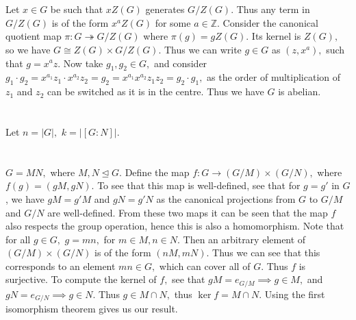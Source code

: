 \documentclass{article}
\begin{document}
\section{} %
Let $x \in G$ be such that $xZ(G)$ generates $G/Z(G).$ Thus any term in $G/Z(G)$ is of the form $x^aZ(G)$ for some $a \in \mathbb{Z}.$ Consider the 
canonical quotient map $\pi: G \twoheadrightarrow G/Z(G)$ where $\pi(g)=gZ(G).$ Its kernel is $Z(G),$ so we have $G \cong Z(G) \times G/Z(G).$ Thus we can 
write $g \in G$ as $(z,x^a),$ such that $g=x^az.$ Now take $g_1,g_2 \in G,$ and consider $g_1 \cdot g_2=x^{a_1}z_1 \cdot x^{a_2}z_2=g_2=x^{a_1} 
x^{a_2}z_1z_2=g_2 \cdot g_1,$ as the order of multiplication of $z_1$ and $z_2$ can be switched as it is in the centre. Thus we have $G$ is abelian.  
\section{} %
Let $n=|G|,$ $k=|[G:N]|.$ 
\section{} %
$G=MN,$ where $M,N \trianglelefteq G.$ Define the map $f: G \rightarrow (G/M) \times (G/N),$ where $f(g)=(gM,gN).$ To see that this map is well-defined, see 
that for $g=g'$ in $G$, we have $gM=g'M$ and $gN=g'N$ as the canonical projections from $G$ to $G/M$ and $G/N$ are well-defined. From these two maps it can 
be seen that the map $f$ also respects the group operation, hence this is also a homomorphism. Note that for all $g \in G,$ $g=mn,$ for $m \in M, n \in N.$ 
Then an arbitrary element of $(G/M) \times (G/N)$ is of the form $(nM,mN).$ Thus we can see that this corresponds to an element $mn \in G,$ which can cover 
all of $G.$ Thus $f$ is surjective. To compute the kernel of $f,$ see that $gM=e_{G/M} \implies g \in M,$ and $gN=e_{G/N} \implies g \in N$. Thus $g \in M 
\cap N,$ thus $\ker f=M \cap N.$ Using the first isomorphism theorem gives us our result. 
\end{document}
